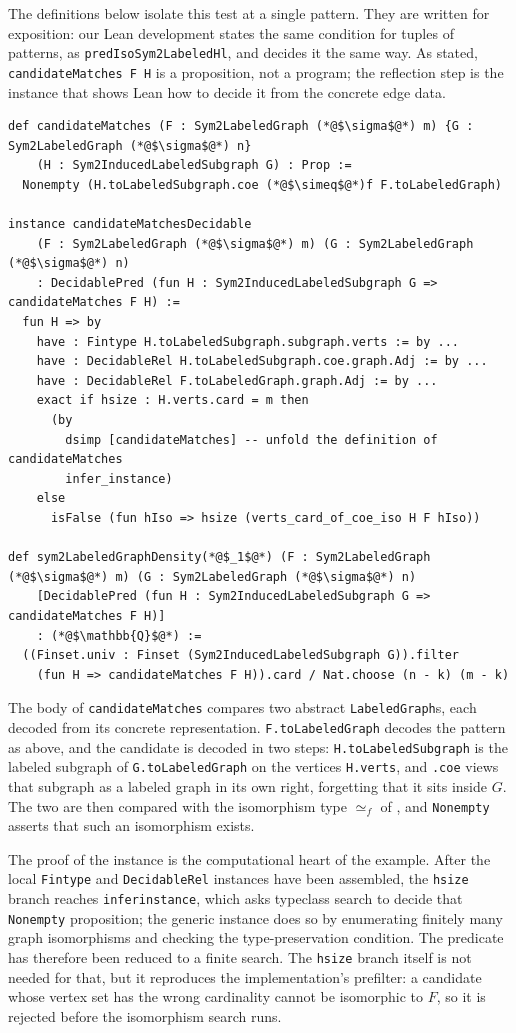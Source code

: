 \documentclass[acmsmall,screen=true,acmthm=false]{acmart}
\DeclareRobustCommand{\lean}[1]{{\def\_{\textunderscore\allowbreak}\texttt{#1}}}
\begin{document}
The definitions below isolate this test at a single pattern.  They are written
for exposition: our Lean development states the same condition for tuples of
patterns, as \lean{predIsoSym2LabeledHl}, and decides it the same way.  As
stated, \lean{candidateMatches F H} is a proposition, not a program; the
reflection step is the instance that shows Lean how to decide it from the
concrete edge data.
\begin{lstlisting}
def candidateMatches (F : Sym2LabeledGraph (*@$\sigma$@*) m) {G : Sym2LabeledGraph (*@$\sigma$@*) n}
    (H : Sym2InducedLabeledSubgraph G) : Prop :=
  Nonempty (H.toLabeledSubgraph.coe (*@$\simeq$@*)f F.toLabeledGraph)

instance candidateMatchesDecidable
    (F : Sym2LabeledGraph (*@$\sigma$@*) m) (G : Sym2LabeledGraph (*@$\sigma$@*) n)
    : DecidablePred (fun H : Sym2InducedLabeledSubgraph G => candidateMatches F H) :=
  fun H => by
    have : Fintype H.toLabeledSubgraph.subgraph.verts := by ...
    have : DecidableRel H.toLabeledSubgraph.coe.graph.Adj := by ...
    have : DecidableRel F.toLabeledGraph.graph.Adj := by ...
    exact if hsize : H.verts.card = m then
      (by
        dsimp [candidateMatches] -- unfold the definition of candidateMatches
        infer_instance)
    else
      isFalse (fun hIso => hsize (verts_card_of_coe_iso H F hIso))

def sym2LabeledGraphDensity(*@$_1$@*) (F : Sym2LabeledGraph (*@$\sigma$@*) m) (G : Sym2LabeledGraph (*@$\sigma$@*) n)
    [DecidablePred (fun H : Sym2InducedLabeledSubgraph G => candidateMatches F H)]
    : (*@$\mathbb{Q}$@*) :=
  ((Finset.univ : Finset (Sym2InducedLabeledSubgraph G)).filter
    (fun H => candidateMatches F H)).card / Nat.choose (n - k) (m - k)
\end{lstlisting}
The body of \lean{candidateMatches} compares two abstract \lean{LabeledGraph}s,
each decoded from its concrete representation.
\lean{F.toLabeledGraph} decodes the pattern as above, and the candidate is
decoded in two steps: \lean{H.toLabeledSubgraph} is the labeled subgraph of
\lean{G.toLabeledGraph} on the vertices \lean{H.verts}, and \lean{.coe} views
that subgraph as a labeled graph in its own right, forgetting that it sits
inside \(G\).  The two are then compared with the isomorphism type
\(\simeq_f\) of , and \lean{Nonempty} asserts that such an
isomorphism exists.

The proof of the instance is the computational heart of the example.  After the
local \lean{Fintype} and \lean{DecidableRel} instances have been assembled, the
\lean{hsize} branch reaches \lean{infer\_instance}, which asks typeclass search
to decide that \lean{Nonempty} proposition; the generic instance does so by
enumerating finitely many graph isomorphisms and checking the type-preservation
condition.  The predicate has therefore been reduced to a finite search.  The
\lean{hsize} branch itself is not needed for that, but it reproduces the
implementation's prefilter: a candidate whose vertex set has the wrong
cardinality cannot be isomorphic to \(F\), so it is rejected before the
isomorphism search runs.
\end{document}
